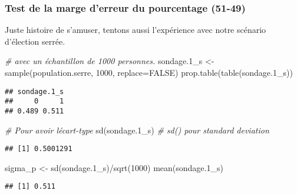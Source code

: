 \documentclass[
]{book}
\newenvironment{Shaded}{\begin{snugshade}}{\end{snugshade}}
\newcommand{\AttributeTok}[1]{\textcolor[rgb]{0.77,0.63,0.00}{#1}}
\newcommand{\CommentTok}[1]{\textcolor[rgb]{0.56,0.35,0.01}{\textit{#1}}}
\newcommand{\ConstantTok}[1]{\textcolor[rgb]{0.00,0.00,0.00}{#1}}
\newcommand{\DecValTok}[1]{\textcolor[rgb]{0.00,0.00,0.81}{#1}}
\newcommand{\FloatTok}[1]{\textcolor[rgb]{0.00,0.00,0.81}{#1}}
\newcommand{\FunctionTok}[1]{\textcolor[rgb]{0.00,0.00,0.00}{#1}}
\newcommand{\NormalTok}[1]{#1}
\newcommand{\OtherTok}[1]{\textcolor[rgb]{0.56,0.35,0.01}{#1}}
\newcommand{\SpecialCharTok}[1]{\textcolor[rgb]{0.00,0.00,0.00}{#1}}
\begin{document}
\hypertarget{test-de-la-marge-derreur-du-pourcentage-51-49}{%
\subsubsection{Test de la marge d'erreur du pourcentage (51-49)}\label{test-de-la-marge-derreur-du-pourcentage-51-49}}

Juste histoire de s'amuser, tentons aussi l'expérience avec notre scénario d'élection serrée.

\begin{Shaded}
\begin{Highlighting}[]
\CommentTok{\# avec un échantillon de 1000 personnes.}
\NormalTok{sondage}\FloatTok{.1}\NormalTok{\_s }\OtherTok{\textless{}{-}} \FunctionTok{sample}\NormalTok{(population.serre, }\DecValTok{1000}\NormalTok{, }\AttributeTok{replace=}\ConstantTok{FALSE}\NormalTok{)}
\FunctionTok{prop.table}\NormalTok{(}\FunctionTok{table}\NormalTok{(sondage}\FloatTok{.1}\NormalTok{\_s))}
\end{Highlighting}
\end{Shaded}

\begin{verbatim}
## sondage.1_s
##     0     1 
## 0.489 0.511
\end{verbatim}

\begin{Shaded}
\begin{Highlighting}[]
\CommentTok{\# Pour avoir l\textquotesingle{}écart{-}type}
\FunctionTok{sd}\NormalTok{(sondage}\FloatTok{.1}\NormalTok{\_s) }\CommentTok{\# sd() pour standard deviation}
\end{Highlighting}
\end{Shaded}

\begin{verbatim}
## [1] 0.5001291
\end{verbatim}

\begin{Shaded}
\begin{Highlighting}[]
\NormalTok{sigma\_p }\OtherTok{\textless{}{-}} \FunctionTok{sd}\NormalTok{(sondage}\FloatTok{.1}\NormalTok{\_s)}\SpecialCharTok{/}\FunctionTok{sqrt}\NormalTok{(}\DecValTok{1000}\NormalTok{)}
\FunctionTok{mean}\NormalTok{(sondage}\FloatTok{.1}\NormalTok{\_s)}
\end{Highlighting}
\end{Shaded}

\begin{verbatim}
## [1] 0.511
\end{verbatim}
\end{document}
